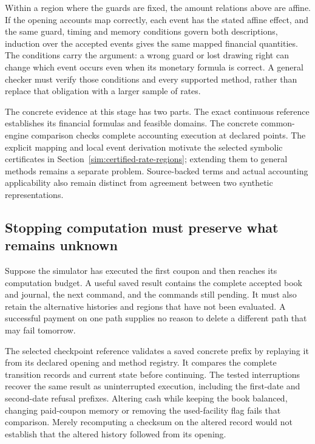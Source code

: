 Within a region where the guards are fixed, the amount relations above are affine. If the opening accounts map correctly, each event has the stated affine effect, and the same guard, timing and memory conditions govern both descriptions, induction over the accepted events gives the same mapped financial quantities. The conditions carry the argument: a wrong guard or lost drawing right can change which event occurs even when its monetary formula is correct. A general checker must verify those conditions and every supported method, rather than replace that obligation with a larger sample of rates.

The concrete evidence at this stage has two parts. The exact continuous reference establishes its financial formulas and feasible domains. The concrete common-engine comparison checks complete accounting execution at declared points. The explicit mapping and local event derivation motivate the selected symbolic certificates in Section~\ref{sim:certified-rate-regions}; extending them to general methods remains a separate problem. Source-backed terms and actual accounting applicability also remain distinct from agreement between two synthetic representations.

\subsection{Stopping computation must preserve what remains unknown}

Suppose the simulator has executed the first coupon and then reaches its computation budget. A useful saved result contains the complete accepted book and journal, the next command, and the commands still pending. It must also retain the alternative histories and regions that have not been evaluated. A successful payment on one path supplies no reason to delete a different path that may fail tomorrow.

The selected checkpoint reference validates a saved concrete prefix by replaying it from its declared opening and method registry. It compares the complete transition records and current state before continuing. The tested interruptions recover the same result as uninterrupted execution, including the first-date and second-date refusal prefixes. Altering cash while keeping the book balanced, changing paid-coupon memory or removing the used-facility flag fails that comparison. Merely recomputing a checksum on the altered record would not establish that the altered history followed from its opening.

